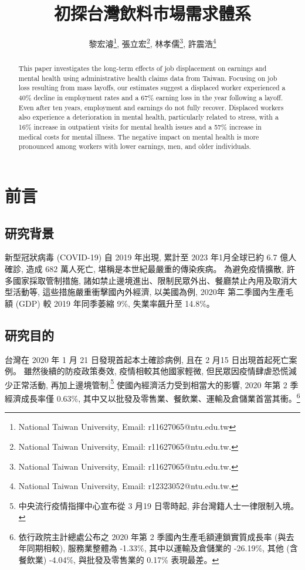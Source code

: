 \documentclass[12pt]{article}
\begin{document}
	
	\title{\Large 初探台灣飲料市場需求體系}
	
	\author{\normalsize 黎宏濬\thanks{National Taiwan University, Email: r11627065@ntu.edu.tw}, 張立宏\thanks{National Taiwan University, Email: r11627065@ntu.edu.tw.},  林孝儒\thanks{National Taiwan University, Email: r11627065@ntu.edu.tw.},  許震浩\thanks{National Taiwan University, Email: r12323052@ntu.edu.tw.} \medskip}
	
	
	\maketitle
	
\begin{abstract}
This paper investigates the long-term effects of job displacement on earnings and mental health using administrative health claims data from Taiwan. Focusing on job loss resulting from mass layoffs, our estimates suggest a displaced worker experienced a 40\% decline in employment rates and a 67\% earning loss in the year following a layoff. Even after ten years, employment and earnings do not fully recover. Displaced workers also experience a deterioration in mental health, particularly related to stress, with a 16\% increase in outpatient visits for mental health issues and a 57\% increase in medical costs for mental illness. The negative impact on mental health is more pronounced among workers with lower earnings, men, and older individuals.
	
\end{abstract}


\newpage

\section{前言}
\subsection{研究背景}
新型冠狀病毒 (COVID-19) 自 2019 年出現, 
累計至 2023 年1月全球已約 6.7 億人確診, 造成 682 萬人死亡, 堪稱是本世紀最嚴重的傳染疾病。
為避免疫情擴散, 許多國家採取管制措施, 諸如禁止邊境進出、限制民眾外出、餐廳禁止內用及取消大型活動等, 
這些措施嚴重衝擊國內外經濟, 以美國為例, 2020年 第二季國內生產毛額 (GDP) 較 2019 年同季萎縮 9\%, 
失業率飆升至 14.8\%。
\subsection{研究目的}
台灣在 2020 年 1 月 21 日發現首起本土確診病例, 
且在 2 月15 日出現首起死亡案例。
雖然後續的防疫政策奏效, 疫情相較其他國家輕微, 
但民眾因疫情肆虐恐慌減少正常活動, 再加上邊境管制,\footnote{中央流行疫情指揮中心宣布從 3 月19 日零時起, 非台灣籍人士一律限制入境。}
使國內經濟活力受到相當大的影響, 2020 年第 2 季經濟成長率僅 0.63\%, 
其中又以批發及零售業、餐飲業、運輸及倉儲業首當其衝。\footnote{依行政院主計總處公布之 2020 年第 2 季國內生產毛額連鎖實質成長率 (與去年同期相較), 服務業整體為 -1.33\%, 其中以運輸及倉儲業的 -26.19\%, 其他 (含餐飲業) -4.04\%, 與批發及零售業的 0.17\% 表現最差。}
\end{document}

